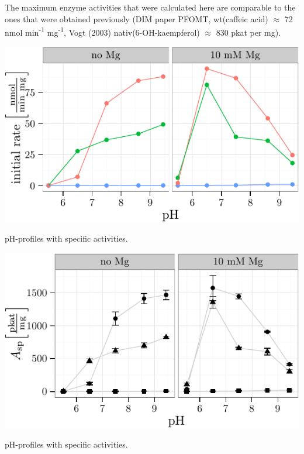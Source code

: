 \documentclass[]{tufte-handout}
\begin{document}
The maximum enzyme activities that were calculated here are comparable
to the ones that were obtained previously (DIM paper PFOMT, wt(caffeic
acid) \(\approx\) 72 nmol min\textsuperscript{-1}
mg\textsuperscript{-1}, Vogt (2003) nativ(6-OH-kaempferol) \(\approx\)
830 pkat per mg).

\begin{marginfigure}
 \includegraphics{analysis_tufte_files/figure-latex/unnamed-chunk-14-1.pdf}
\caption{pH-profiles with specific activities.}
\end{marginfigure}\begin{marginfigure}
 \includegraphics{analysis_tufte_files/figure-latex/unnamed-chunk-14-2.pdf}
\caption{pH-profiles with specific activities.}
\end{marginfigure}
\end{document}
